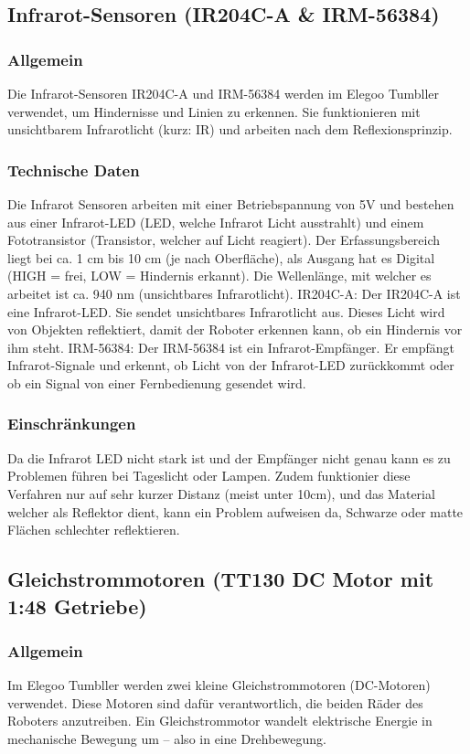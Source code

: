 \subsection{Infrarot-Sensoren (IR204C-A \& IRM-56384)}
%
\subsubsection{Allgemein}
Die Infrarot-Sensoren IR204C-A und IRM-56384 werden im Elegoo Tumbller verwendet, um Hindernisse und Linien zu erkennen.
Sie funktionieren mit unsichtbarem Infrarotlicht (kurz: IR) und arbeiten nach dem Reflexionsprinzip.
\subsubsection{Technische Daten}
Die Infrarot Sensoren arbeiten mit einer Betriebspannung von 5V und bestehen aus einer Infrarot-LED (LED, welche Infrarot Licht ausstrahlt) und 
einem Fototransistor (Transistor, welcher auf Licht reagiert). 
Der Erfassungsbereich liegt bei ca. 1 cm bis 10 cm (je nach Oberfläche), als Ausgang hat es Digital (HIGH = frei, LOW = Hindernis erkannt). 
Die Wellenlänge, mit welcher es arbeitet ist ca. 940 nm (unsichtbares Infrarotlicht).
IR204C-A:
Der IR204C-A ist eine Infrarot-LED. Sie sendet unsichtbares Infrarotlicht aus. 
Dieses Licht wird von Objekten reflektiert, damit der Roboter erkennen kann, ob ein Hindernis vor ihm steht.
IRM-56384:
Der IRM-56384 ist ein Infrarot-Empfänger. Er empfängt Infrarot-Signale und erkennt, ob Licht von der Infrarot-LED zurückkommt oder ob ein Signal von einer Fernbedienung gesendet wird.
\subsubsection{Einschränkungen}
Da die Infrarot LED nicht stark ist  und der Empfänger nicht genau kann es zu Problemen führen bei Tageslicht oder Lampen. 
Zudem funktionier diese Verfahren nur auf sehr kurzer Distanz (meist unter 10cm), und das Material welcher als Reflektor dient, kann ein Problem aufweisen da, 
Schwarze oder matte Flächen schlechter reflektieren.
%
\subsection{Gleichstrommotoren (TT130 DC Motor mit 1:48 Getriebe)}
%
\subsubsection{Allgemein}
Im Elegoo Tumbller werden zwei kleine Gleichstrommotoren (DC-Motoren) verwendet.
Diese Motoren sind dafür verantwortlich, die beiden Räder des Roboters anzutreiben.
Ein Gleichstrommotor wandelt elektrische Energie in mechanische Bewegung um – also in eine Drehbewegung.

